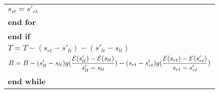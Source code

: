 \begin{table}
\begin{minipage}[b]{8cm}
\begin{tabular}{p{7cm}}
\hspace{7mm} $s_{rt} = s'_{rt}$
\\
\hspace{7mm}\textbf{end for}
\\
\hspace{4mm}\textbf{end if}
\\
\hspace{4mm} $T = T - (s_{rt}-s'_{lt}) - (s'_{lt} - s_{lt})$
\\
\hspace{4mm}$B = B -  (s'_{lt}-s_{lt})g(\dfrac{\mathcal{E}(s'_{lt})-\mathcal{E}(s_{lt})}{s'_{lt}-s_{lt}}) - (s_{rt}-s'_{rt})g(\dfrac{\mathcal{E}(s_{rt})-\mathcal{E}(s'_{rt})}{s_{rt}-s'_{rt}})$
\\
\textbf{end while}
\end{tabular}
\end{minipage}
\end{table}
